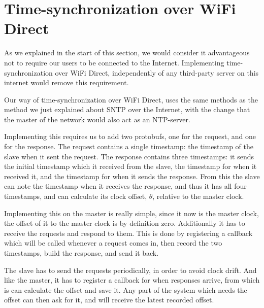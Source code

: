 \section{Time-synchronization over WiFi Direct}
As we explained in the start of this section, we would consider it advantageous not to require our users to be connected to the Internet.
Implementing time-synchronization over WiFi Direct, independently of any third-party server on this internet would remove this requirement.

Our way of time-synchronization over WiFi Direct, uses the same methods as the method we just explained about \ac{SNTP} over the Internet, with the change that the master of the network would also act as an \ac{NTP}-server.

Implementing this requires us to add two protobufs, one for the request, and one for the response.
The request contains a single timestamp: the timestamp of the slave when it sent the request.
The response contains three timestamps: it sends the initial timestamp which it received from the slave, the timestamp for when it received it, and the timestamp for when it sends the response.
From this the slave can note the timestamp when it receives the response, and thus it has all four timestamps, and can calculate its clock offset, $\theta$, relative to the master clock.

Implementing this on the master is really simple, since it now is the master clock, the offset of it to the master clock is by definition zero.
Additionally it has to receive the requests and respond to them.
This is done by registering a callback which will be called whenever a request comes in, then record the two timestamps, build the response, and send it back.

The slave has to send the requests periodically, in order to avoid clock drift.
And like the master, it has to register a callback for when responses arrive, from which is can calculate the offset and save it.
Any part of the system which needs the offset can then ask for it, and will receive the latest recorded offset.

